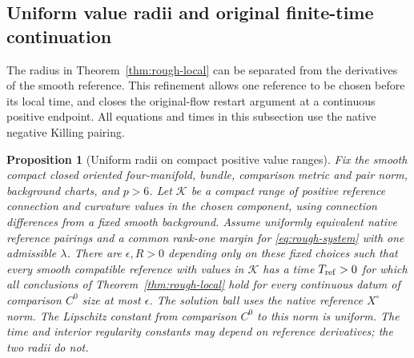 \documentclass[11pt]{article}
\numberwithin{equation}{section}
\newtheorem{proposition}[theorem]{Proposition}
\theoremstyle{definition}
\theoremstyle{remark}
\begin{document}
\subsection{Uniform value radii and original finite-time continuation}
\label{subsec:general-continuation}

The radius in Theorem~\ref{thm:rough-local} can be separated
from the derivatives of the smooth reference. This refinement
allows one reference to be chosen before its local time, and
closes the original-flow restart argument at a continuous
positive endpoint. All equations and times in this subsection
use the native negative Killing pairing.

\begin{proposition}[Uniform radii on compact positive value ranges]
\label{prop:uniform-value-radii}
Fix the smooth compact closed oriented four-manifold, bundle,
comparison metric and pair norm, background charts, and \(p>6\).
Let \(\mathcal K\) be a compact range of positive reference
connection and curvature values in the chosen component,
using connection differences from a fixed smooth background.
Assume uniformly equivalent native reference pairings and a
common rank-one margin for \eqref{eq:rough-system} with one
admissible \(\lambda\). There are \(\epsilon,R>0\) depending
only on these fixed choices such that every smooth compatible
reference with values in \(\mathcal K\) has a time
\(T_{\rm ref}>0\) for which all conclusions of
Theorem~\ref{thm:rough-local} hold for every continuous datum
of comparison \(C^0\) size at most \(\epsilon\).
The solution ball uses the native reference \(X^\circ\) norm.
The Lipschitz constant from comparison \(C^0\) to this norm
is uniform. The time and interior regularity constants may
depend on reference derivatives; the two radii do not.
\end{proposition}
\end{document}
